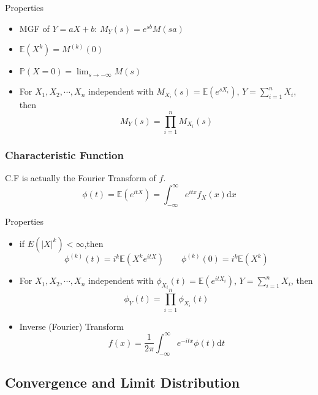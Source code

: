     Properties
    \begin{itemize}
        \item MGF of $Y=aX+b$: $
            M_Y(s)=e^{sb}M(sa)    $
        \item $\mathbb{E}(X^k)=M^{(k)}(0)$
        \item $\mathbb{P}(X=0)={\displaystyle\lim_{s\to -\infty}}M(s)$
        \item For $X_1,X_2,\cdots,X_n$ independent with $M_{X_i}(s)=\mathbb{E}(e^{sX_i})$, $Y={\displaystyle \sum_{i=1}^n} X_i$, then
        \begin{equation}    
            M_Y(s)=\prod_{i=1}^n M_{X_i}(s)
        \end{equation}
    \end{itemize}
\subsubsection{Characteristic Function}
    C.F is actually the Fourier Transform of $f$.
    \begin{equation}
        \phi(t)=\mathbb{E}(e^{itX}) = \int_{-\infty}^\infty e^{itx}f_X(x)\mathrm{d}x
    \end{equation}

    Properties
    \begin{itemize}
    \item if $E(|X|^k)<\infty$,then
    \begin{equation}
        \phi^{(k)}(t)=i^k\mathbb{E}(X^ke^{itX})\qquad \phi^{(k)}(0)=i^k\mathbb{E}(X^k)    
    \end{equation}
    \item For $X_1,X_2,\cdots,X_n$ independent with $\phi_{X_i}(t)=\mathbb{E}(e^{itX_i})$, $Y={\displaystyle \sum_{i=1}^n} X_i$, then
    \begin{equation}
        \phi_Y(t)=\prod_{i=1}^n \phi_{X_i}(t)
    \end{equation}
    \item Inverse (Fourier) Transform
    \begin{equation}
        f(x)=\frac{1}{2\pi}\int_{-\infty}^\infty e^{-itx}\phi(t)\mathrm{d}t    
    \end{equation}
\end{itemize}



\subsection{Convergence and Limit Distribution}
